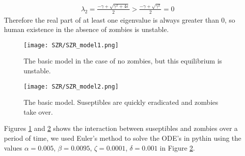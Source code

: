 \documentclass{mm2}
\numberwithin{equation}{section}
\theoremstyle{definition}
\begin{document}
\begin{eqnarray}
\lambda_2 =\frac{-\gamma + \sqrt{\gamma^2 + 4\epsilon}}{2} > \frac{-\gamma + \sqrt{\gamma^2}}{2} = 0
\end{eqnarray}
Therefore the real part of at least one eigenvalue is always greater than 0, so human existence in the absence of zombies is unstable. \cite{Strickland}\newpage
\begin{figure}[ht]
	\centering
	\texttt{[image: SZR/SZR\_model1.png]}
	\caption{The basic model in the case of no zombies, but this equilibrium is unstable.}
	\label{szr1graph}
\end{figure}
\begin{figure}[ht]
	\centering
	\texttt{[image: SZR/SZR\_model2.png]}
	\caption{The basic model. Suseptibles are quickly eradicated and zombies take over.}
	\label{szr2graph}
\end{figure}
Figures \ref{szr1graph} and \ref{szr2graph} shows the interaction between suseptibles and zombies over a period of time, we used Euler's method to solve the ODE's in pythin using the values $\alpha = 0.005$, $\beta = 0.0095$, $\zeta = 0.0001$, $\delta = 0.001$ in Figure \ref{szr2graph}.\newline
\end{document}
